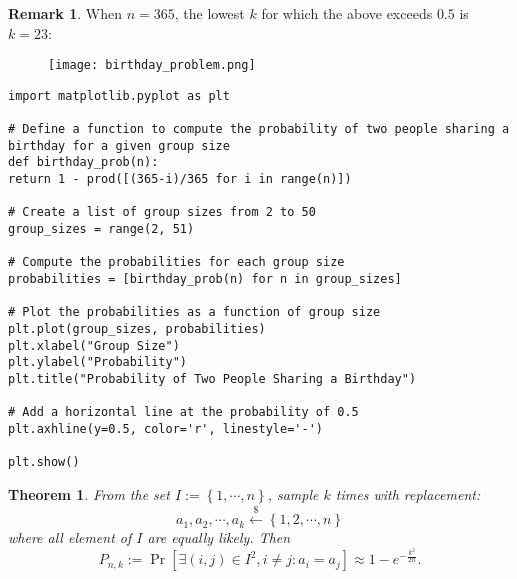 \documentclass[12pt,openany]{book}
\newtheorem{theorem}{Theorem}[chapter]
\theoremstyle{definition}
\newtheorem{remark}{Remark}[chapter]
\newcommand{\set}[1]{\left\{#1\right\}}
\newcommand{\of}[1]{\left( #1 \right)}
\newcommand{\dollar}{\$}
\newcommand{\uniform}{\xleftarrow{\dollar}}
\begin{document}
	\begin{remark}
		When $n=365$, the lowest $k$ for which the above exceeds $0.5$ is $k=23$: \begin{figure}[ht!]
			\centering
			\texttt{[image: birthday\_problem.png]}
		\end{figure}
		\begin{lstlisting}[style=sage, caption={Birthday Bound (Sage)},captionpos=t]
import matplotlib.pyplot as plt

# Define a function to compute the probability of two people sharing a birthday for a given group size
def birthday_prob(n):
return 1 - prod([(365-i)/365 for i in range(n)])

# Create a list of group sizes from 2 to 50
group_sizes = range(2, 51)

# Compute the probabilities for each group size
probabilities = [birthday_prob(n) for n in group_sizes]

# Plot the probabilities as a function of group size
plt.plot(group_sizes, probabilities)
plt.xlabel("Group Size")
plt.ylabel("Probability")
plt.title("Probability of Two People Sharing a Birthday")

# Add a horizontal line at the probability of 0.5
plt.axhline(y=0.5, color='r', linestyle='-')

plt.show()
		\end{lstlisting}
	\end{remark}
	\newpage
	\begin{tcolorbox}[colback=white,colframe=thmcolor,arc=5pt,title={\color{white}\bf Birthday Bound}]
		\begin{theorem}
			From the set $I:=\set{1,\cdots,n}$, sample $k$ times with replacement: \[
			a_1,a_2,\cdots,a_k\uniform\set{1,2,\cdots,n}
			\] where all element of $I$ are equally likely. Then \[
			P_{n,k}:=\Pr\left[\exists \of{i,j}\in I^2, i\neq j:a_i=a_j\right]\approx 1-e^{-\frac{k^2}{2n}}.
			\]
		\end{theorem}
	\end{tcolorbox}
\end{document}
